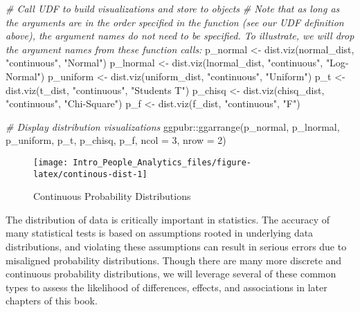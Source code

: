 \documentclass[
]{book}
\newenvironment{Shaded}{\begin{snugshade}}{\end{snugshade}}
\newcommand{\AttributeTok}[1]{\textcolor[rgb]{0.77,0.63,0.00}{#1}}
\newcommand{\CommentTok}[1]{\textcolor[rgb]{0.56,0.35,0.01}{\textit{#1}}}
\newcommand{\DecValTok}[1]{\textcolor[rgb]{0.00,0.00,0.81}{#1}}
\newcommand{\FunctionTok}[1]{\textcolor[rgb]{0.00,0.00,0.00}{#1}}
\newcommand{\NormalTok}[1]{#1}
\newcommand{\OtherTok}[1]{\textcolor[rgb]{0.56,0.35,0.01}{#1}}
\newcommand{\SpecialCharTok}[1]{\textcolor[rgb]{0.00,0.00,0.00}{#1}}
\newcommand{\StringTok}[1]{\textcolor[rgb]{0.31,0.60,0.02}{#1}}
\begin{document}
\begin{Shaded}
\begin{Highlighting}[]
\CommentTok{\# Call UDF to build visualizations and store to objects}
\CommentTok{\# Note that as long as the arguments are in the order specified in the function (see our UDF definition above), the argument names do not need to be specified. To illustrate, we will drop the argument names from these function calls:}
\NormalTok{p\_normal }\OtherTok{\textless{}{-}} \FunctionTok{dist.viz}\NormalTok{(normal\_dist, }\StringTok{"continuous"}\NormalTok{, }\StringTok{"Normal"}\NormalTok{)}
\NormalTok{p\_lnormal }\OtherTok{\textless{}{-}} \FunctionTok{dist.viz}\NormalTok{(lnormal\_dist, }\StringTok{"continuous"}\NormalTok{, }\StringTok{"Log{-}Normal"}\NormalTok{)}
\NormalTok{p\_uniform }\OtherTok{\textless{}{-}} \FunctionTok{dist.viz}\NormalTok{(uniform\_dist, }\StringTok{"continuous"}\NormalTok{, }\StringTok{"Uniform"}\NormalTok{)}
\NormalTok{p\_t }\OtherTok{\textless{}{-}} \FunctionTok{dist.viz}\NormalTok{(t\_dist, }\StringTok{"continuous"}\NormalTok{, }\StringTok{"Student\textquotesingle{}s T"}\NormalTok{)}
\NormalTok{p\_chisq }\OtherTok{\textless{}{-}} \FunctionTok{dist.viz}\NormalTok{(chisq\_dist, }\StringTok{"continuous"}\NormalTok{, }\StringTok{"Chi{-}Square"}\NormalTok{)}
\NormalTok{p\_f }\OtherTok{\textless{}{-}} \FunctionTok{dist.viz}\NormalTok{(f\_dist, }\StringTok{"continuous"}\NormalTok{, }\StringTok{"F"}\NormalTok{)}

\CommentTok{\# Display distribution visualizations}
\NormalTok{ggpubr}\SpecialCharTok{::}\FunctionTok{ggarrange}\NormalTok{(p\_normal, p\_lnormal, p\_uniform, p\_t, p\_chisq, p\_f,}
          \AttributeTok{ncol =} \DecValTok{3}\NormalTok{, }\AttributeTok{nrow =} \DecValTok{2}\NormalTok{)}
\end{Highlighting}
\end{Shaded}

\begin{figure}

{\centering \texttt{[image: Intro\_People\_Analytics\_files/figure-latex/continous-dist-1]} 

}

\caption{Continuous Probability Distributions}\label{fig:continous-dist}
\end{figure}

The distribution of data is critically important in statistics. The accuracy of many statistical tests is based on assumptions rooted in underlying data distributions, and violating these assumptions can result in serious errors due to misaligned probability distributions. Though there are many more discrete and continuous probability distributions, we will leverage several of these common types to assess the likelihood of differences, effects, and associations in later chapters of this book.
\end{document}
